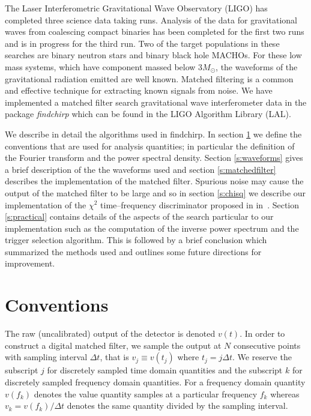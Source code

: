 
The Laser Interferometric Gravitational Wave Observatory (LIGO)\cite{barish}
has completed three science data taking runs. Analysis of the data for
gravitational waves from coalescing compact binaries has been completed for
the first two runs\cite{bns1,bns2} and is in progress for the third run. Two
of the target populations in these searches are binary neutron
stars\cite{300yrs} and binary black hole MACHOs\cite{sammacho,nakamura}. For
these low mass systems, which have component massed below $3 M_\odot$, the
waveforms of the gravitational radiation emitted are well
known\cite{bdiww,biww}.  Matched filtering is a common and effective technique
for extracting known signals from noise\cite{wz}. We have implemented a
matched filter search gravitational wave interferometer data in the package
\emph{findchirp} which can be found in the LIGO Algorithm Library
(LAL)\cite{lal}.

We describe in detail the algorithms used in findchirp. In section
\ref{s:conventions} we define the conventions that are used for analysis
quantities; in particular the definition of the Fourier transform and the
power spectral density. Section \ref{s:waveforms} gives a brief description of
the the waveforms used and section \ref{s:matchedfilter} describes the
implementation of the matched filter.  Spurious noise may cause the output of
the matched filter to be large and so in section \ref{s:chisq} we describe our
implementation of the $\chi^2$ time--frequency discriminator proposed in
in~\cite{allen}. Section \ref{s:practical} contains details of the aspects of
the search particular to our implementation such as the computation of the
inverse power spectrum and the trigger selection algorithm. This is followed
by a brief conclusion which summarized the methods used and outlines some
future directions for improvement.

\section{Conventions}
\label{s:conventions}

The raw (uncalibrated) output of the detector is denoted $v(t)$. In order to
construct a digital matched filter, we sample the output at $N$ consecutive
points with sampling interval $\Delta t$, that is $v_j \equiv v(t_j)$ where
$t_j = j\Delta t$. We reserve the subscript $j$ for discretely sampled time
domain quantities and the subscript $k$ for discretely sampled frequency
domain quantities. For a frequency domain quantity $v(f_k)$ denotes the
value quantity samples at a particular frequency $f_k$ whereas $v_k = v(f_k)
/ \Delta t$ denotes the same quantity divided by the sampling interval.

